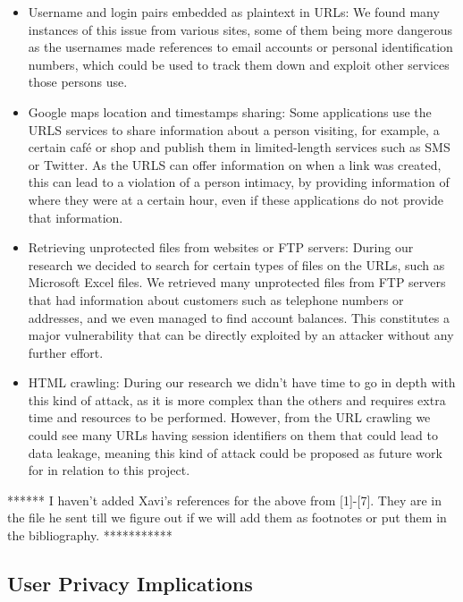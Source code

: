 \documentclass[12pt]{article}
\begin{document}
\begin{itemize}

\item  Username and login pairs embedded as plaintext in URLs: We found many instances of this issue from various sites, some of them being more dangerous as the usernames made references to email accounts or personal identification numbers, which could be used to track them down and exploit other services those persons use.

\item  Google maps location and timestamps sharing: Some applications use the URLS services to share information about a person visiting, for example, a certain café or shop and publish them in limited-length services such as SMS or Twitter. As the URLS can offer information on when a link was created, this can lead to a violation of a person intimacy, by providing information of where they were at a certain hour, even if these applications do not provide that information.

\item  Retrieving unprotected files from websites or FTP servers: During our research we decided to search for certain types of files on the URLs, such as Microsoft Excel files. We retrieved many unprotected files from FTP servers that had information about customers such as telephone numbers or addresses, and we even managed to find account balances. This constitutes a major vulnerability that can be directly exploited by an attacker without any further effort.

\item  HTML crawling: During our research we didn't have time to go in depth with this kind of attack, as it is more complex than the others and requires extra time and resources to be performed. However, from the URL crawling we could see many URLs having session identifiers on them that could lead to data leakage, meaning this kind of attack could be proposed as future work for in relation to this project.

\end{itemize}

****** I haven't added Xavi's references for the above from [1]-[7]. They are in the file he sent till we figure out if we will add them as footnotes or put them in the bibliography. ***********

\subsection{User Privacy Implications}
\end{document}
